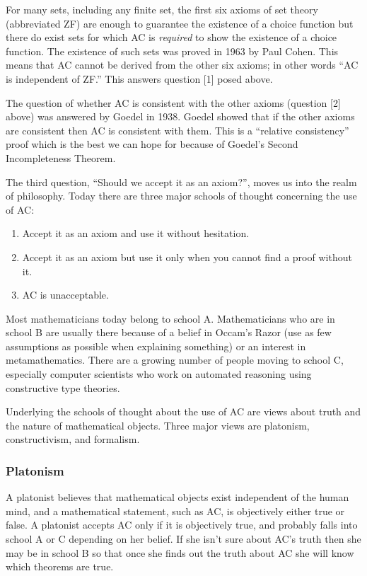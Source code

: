 For many sets, including any finite set, the first six axioms of set
theory (abbreviated ZF) are enough to guarantee the existence of a
choice function but there do exist sets for which AC is {\em required}
to show the existence of a choice function.  The existence of such sets
was proved in 1963 by Paul Cohen.  This means that AC cannot be derived
from the other six axioms; in other words ``AC is independent of ZF.''
This answers question [1] posed above.

The question of whether AC is consistent with the other axioms (question
[2] above) was answered by Goedel in 1938.  Goedel showed that if the
other axioms are consistent then AC is consistent with them.  This is a
``relative consistency'' proof which is the best we can hope for because
of Goedel's Second Incompleteness Theorem.

The third question, ``Should we accept it as an axiom?'', moves us into
the realm of philosophy.  Today there are three major schools of thought
concerning the use of AC:

\begin{enumerate}
  \item Accept it as an axiom and use it without hesitation.
  \item Accept it as an axiom but use it only when you cannot find a
  proof without it.
  \item AC is unacceptable.
\end{enumerate}

Most mathematicians today belong to school A.  Mathematicians who are in
school B are usually there because of a belief in Occam's Razor (use as
few assumptions as possible when explaining something) or an interest in
metamathematics.  There are a growing number of people moving to school
C, especially computer scientists who work on automated reasoning using
constructive type theories.

Underlying the schools of thought about the use of AC are views about
truth and the nature of mathematical objects.  Three major views are
platonism, constructivism, and formalism.

\subsubsection{Platonism}

A platonist believes that mathematical objects exist independent of the
human mind, and a mathematical statement, such as AC, is objectively
either true or false.  A platonist accepts AC only if it is objectively
true, and probably falls into school A or C depending on her belief.  If
she isn't sure about AC's truth then she may be in school B so that once
she finds out the truth about AC she will know which theorems are true.

